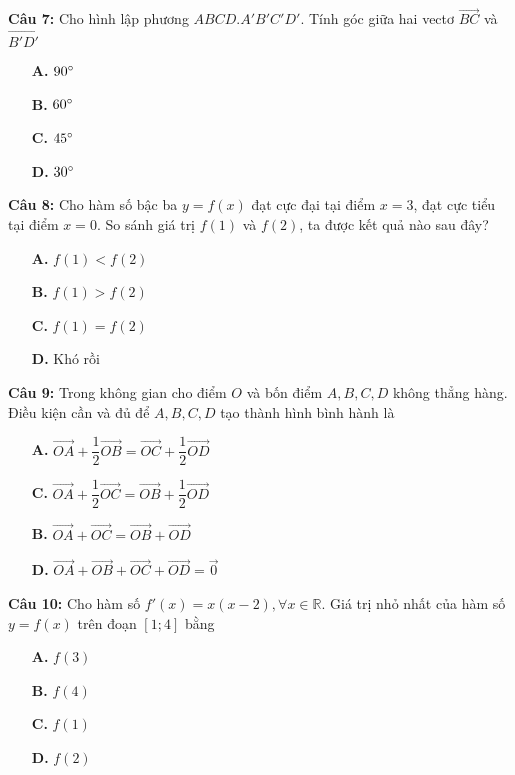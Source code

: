 \documentclass[12pt, a4paper]{article}
\begin{document}
\textbf{Câu 7: } Cho hình lập phương $ ABCD.A'B'C'D' $. Tính góc giữa hai vectơ $ \overrightarrow{BC} $ và $ \overrightarrow{B'D'} $
	\begin{multicols}{4}
		\begin{enumerate}
			\item[\textbf{A.}] $ 90 \degree $
			\item[\textbf{B.}] $ 60 \degree $
			\item[\textbf{C.}] $ 45 \degree $
			\item[\textbf{D.}] $ 30 \degree $
		\end{enumerate}
	\end{multicols}

\textbf{Câu 8: } Cho hàm số bậc ba $ y = f(x) $ đạt cực đại tại điểm $ x = 3 $, đạt cực tiểu tại điểm $ x = 0 $. So sánh giá trị $ f(1) $ và $ f(2) $, ta được kết quả nào sau đây?
	\begin{multicols}{4}
		\begin{enumerate}
			\item[\textbf{A.}] $ f(1) < f(2) $
			\item[\textbf{B.}] $ f(1) > f(2) $
			\item[\textbf{C.}] $ f(1) = f(2) $
			\item[\textbf{D.}] Khó rồi
		\end{enumerate}
	\end{multicols}
	
\textbf{Câu 9: } Trong không gian cho điểm $ O $ và bốn điểm $ A, B, C, D $ không thẳng hàng. Điều kiện cần và đủ để $ A, B, C, D $ tạo thành hình bình hành là
	\begin{multicols}{2}
		\begin{enumerate}
			\item[\textbf{A.}] $ \overrightarrow{OA} + \dfrac{1}{2} \overrightarrow{OB} = \overrightarrow{OC} + \dfrac{1}{2} \overrightarrow{OD} $
			\item[\textbf{C.}] $ \overrightarrow{OA} + \dfrac{1}{2} \overrightarrow{OC} = \overrightarrow{OB} + \dfrac{1}{2} \overrightarrow{OD} $
			\item[\textbf{B.}] $ \overrightarrow{OA} + \overrightarrow{OC} = \overrightarrow{OB} + \overrightarrow{OD} $
 			\item[\textbf{D.}] $ \overrightarrow{OA} + \overrightarrow{OB} + \overrightarrow{OC} + \overrightarrow{OD} = \vec{0} $
		\end{enumerate}
	\end{multicols}

\textbf{Câu 10: } Cho hàm số $ f'(x) = x(x - 2), \forall x \in \mathbb{R} $. Giá trị nhỏ nhất của hàm số $ y = f(x) $ trên đoạn $ [1;4] $ bằng
	\begin{multicols}{4}
		\begin{enumerate}
			\item[\textbf{A.}] $ f(3) $
			\item[\textbf{B.}] $ f(4) $
			\item[\textbf{C.}] $ f(1) $
			\item[\textbf{D.}] $ f(2) $
		\end{enumerate}
	\end{multicols}
\end{document}
